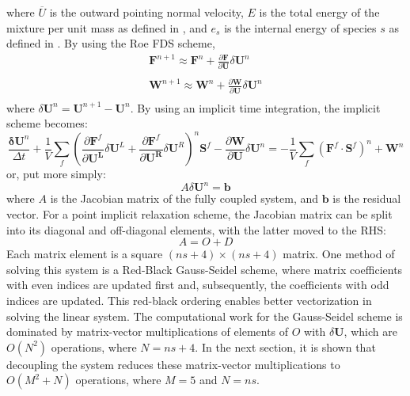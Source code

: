 where $\overline{U}$ is the outward pointing normal velocity, $E$ is
the total energy of the mixture per unit mass as defined in
, and $e_s$ is the internal energy of species $s$ as
defined in .  By using the Roe FDS scheme,
\begin{equation}
	\begin{matrix}
		\mathbf{F}^{n+1} \approx \mathbf{F}^n+\frac{\partial \mathbf{F}}{\partial \mathbf{U}}\delta\mathbf{U}^n \\
		\\
		\mathbf{W}^{n+1} \approx \mathbf{W}^n+\frac{\partial \mathbf{W}}{\partial \mathbf{U}}\delta\mathbf{U}^n \\
	\end{matrix}
\end{equation}
where $\delta\mathbf{U}^n = \mathbf{U}^{n+1}- \mathbf{U}^{n}$.  By using an implicit time integration, the implicit scheme becomes:
\begin{equation}
	\frac{\mathbf{\delta U}^n}{\Delta t}+\frac{1}{V}\sum\limits_{f}(\frac{\partial \mathbf{F}^f}{\partial \mathbf{U^L}}\delta\mathbf{U}^L
	+\frac{\partial \mathbf{F}^f}{\partial \mathbf{U^R}}\delta\mathbf{U}^R)^n \mathbf{S}^f
	- \frac{\partial \mathbf{W}}{\partial \mathbf{U}}\delta\mathbf{U}^n
	= -\frac{1}{V}\sum\limits_{f}(\mathbf{F}^f\cdot\mathbf{S}^f)^n + \mathbf{W}^n
\end {equation}
%
or, put more simply:
%
\begin{equation}
	A\delta\mathbf{U}^n = \mathbf{b}
\end{equation}
where $A$ is the Jacobian matrix of the fully coupled system, and $\mathbf{b}$
is the residual vector.  For a point implicit relaxation scheme, the Jacobian
matrix can be split into its diagonal and off-diagonal elements, with the latter
moved to the RHS:
\begin{equation}
\label{decomp_jac}
	A=O+D
\end{equation}
Each matrix element is a square $(ns+4)\times(ns+4)$ matrix.  One method of
solving this system is a Red-Black Gauss-Seidel scheme\cite{red-black}, where
matrix coefficients with even indices are updated first and, subsequently, the
coefficients with odd indices are updated.  This red-black ordering enables
better vectorization in solving the linear system.  The computational work for
the Gauss-Seidel scheme is dominated by matrix-vector multiplications of
elements of $O$ with $\delta\mathbf{U}$, which are $O(N^2)$ operations, where
$N=ns+4$.  In the next section, it is shown that decoupling the system reduces
these matrix-vector multiplications to $O(M^2 + N)$ operations, where $M=5$ and
$N=ns$.

